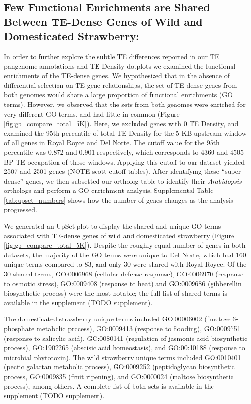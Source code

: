 \documentclass[fleqn,10pt]{olplainarticle}
\begin{document}
\subsection{Few Functional Enrichments are Shared Between TE-Dense Genes of Wild and Domesticated Strawberry:} \label{sec:shared_unshared_go}
In order to further explore the subtle TE differences reported in our TE pangenome annotations and TE Density dotplots we examined the functional enrichments of the TE-dense genes.
We hypothesized that in the absence of differential selection on TE-gene relationships, the set of TE-dense genes from both genomes would share a large proportion of functional enrichments (GO terms).
However, we observed that the sets from both genomes were enriched for very different GO terms, and had little in common (Figure \ref{fig:go_compare_total_5K}).
Here, we excluded genes with 0 TE Density, and examined the 95th percentile of total TE Density for the 5 KB upstream window of all genes in Royal Royce and Del Norte.
The cutoff value for the 95th percentile was 0.872 and 0.901 respectively, which corresponds to 4360 and 4505 BP TE occupation of those windows.
Applying this cutoff to our dataset yielded 2507 and 2501 genes (NOTE scott cutoff tables).
After identifying these ``super-dense'' genes, we then subsetted our ortholog table to identify their \textit{Arabidopsis} orthologs and perform a GO enrichment analysis.
Supplemental Table \ref{tab:upset_numbers} shows how the number of genes changes as the analysis progressed.

We generated an UpSet plot to display the shared and unique GO terms associated with TE-dense genes of wild and domesticated strawberry (Figure \ref{fig:go_compare_total_5K}).
Despite the roughly equal number of genes in both datasets, the majority of the GO terms were unique to Del Norte, which had 160 unique terms compared to 83, and only 30 were shared with Royal Royce.
Of the 30 shared terms, GO:0006968 (cellular defense response), GO:0006970 (response to osmotic stress), GO:0009408 (response to heat) and GO:0009686 (gibberellin biosynthetic process) were the most notable; the full list of shared terms is available in the supplement (TODO supplement).

The domesticated strawberry unique terms included GO:00006002 (fructose 6-phosphate metabolic process), GO:0009413 (response to flooding), GO:0009751 (response to salicylic acid), GO:0080141 (regulation of jasmonic acid biosynthetic process), GO:1902265 (abscisic acid homeostasis), and GO:00:10188 (response to microbial phytotoxin).
The wild strawberry unique terms included GO:0010401 (pectic galactan metabolic process), GO:0009252 (peptidoglycan biosynthetic process, GO:0009835 (fruit ripening), and GO:0000024 (maltose biosynthetic process), 
among others.
A complete list of both sets is available in the supplement (TODO supplement).
\end{document}
